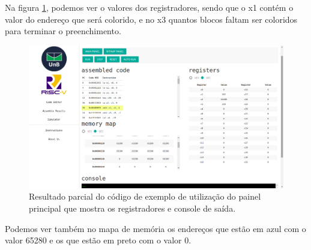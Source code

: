 	Na figura \ref{fig:simulation-bitmap-main-panel}, podemos ver o valores dos registradores, sendo que o x1 contém o valor do endereço que será colorido, e no x3 quantos blocos faltam ser coloridos para terminar o preenchimento.

	\begin{figure}[h!]
	  \centering
	  \includegraphics[width=14cm]{img/simulation_bitmap_main_panel.png}
	  \caption{Resultado parcial do código de exemplo de utilização do painel principal que mostra os registradores e console de saída.}
	  \label{fig:simulation-bitmap-main-panel}
	\end{figure}

	Podemos ver também no mapa de memória os endereços que estão em azul com o valor 65280 e os que estão em preto com o valor 0.